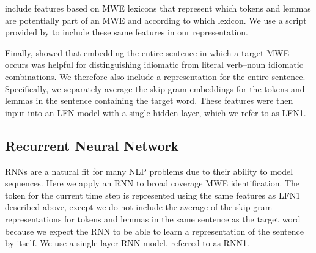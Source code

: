\documentclass[11pt,a4paper]{article}
\begin{document}

 include features based on MWE
lexicons that represent which tokens and lemmas are potentially part
of an MWE and according to which lexicon. We use a script provided by
 to include these same features
in our representation.



Finally,  showed that embedding the
entire sentence in which a target MWE occurs was helpful for
distinguishing idiomatic from literal verb--noun idiomatic
combinations. We therefore also include a representation for the
entire sentence. Specifically, we separately average the skip-gram
embeddings for the tokens and lemmas in the sentence containing the
target word. These features were then input into an LFN model with a
single hidden layer, which we refer to as LFN1.


\subsection{Recurrent Neural Network\label{sec:rnn}}

RNNs are a natural fit for many NLP problems due to their ability to
model sequences. Here we apply an RNN to broad coverage MWE
identification. The token for the current time step is represented
using the same features as LFN1 described above, except we do not
include the average of the skip-gram representations for tokens and
lemmas in the same sentence as the target word because we expect the
RNN to be able to learn a representation of the sentence by itself. We
use a single layer RNN model, referred to as RNN1.


\end{document}
